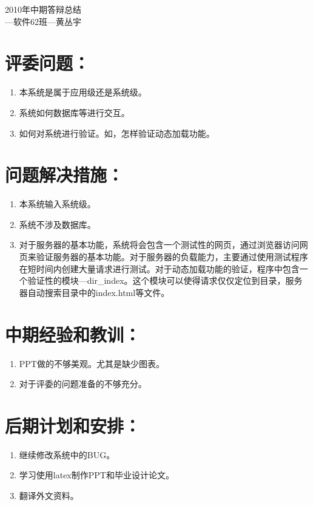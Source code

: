 \documentclass[12pt, a4paper]{article}
\begin{document}
\begin{center}
{\Huge 2010年中期答辩总结}\\
{\Large ---软件62班---黄丛宇}
\end{center}

\section{评委问题：}
\begin{enumerate}[1)]
	\item 本系统是属于应用级还是系统级。
	\item 系统如何数据库等进行交互。
	\item 如何对系统进行验证。如，怎样验证动态加载功能。
\end{enumerate}

\section{问题解决措施：}
\begin{enumerate}[1)]
	\item 本系统输入系统级。
	\item 系统不涉及数据库。
	\item 对于服务器的基本功能，系统将会包含一个测试性的网页，通过浏览器访问网页来验证服务器的基本功能。对于服务器的负载能力，主要通过使用测试程序在短时间内创建大量请求进行测试。对于动态加载功能的验证，程序中包含一个验证性的模块---dir\_index。这个模块可以使得请求仅仅定位到目录，服务器自动搜索目录中的index.html等文件。
\end{enumerate}

\section{中期经验和教训：}
\begin{enumerate}[1)]
	\item PPT做的不够美观。尤其是缺少图表。
	\item 对于评委的问题准备的不够充分。
	
\end{enumerate}

\section{后期计划和安排：}
\begin{enumerate}[1)]
	\item 继续修改系统中的BUG。
	\item 学习使用latex制作PPT和毕业设计论文。
	\item 翻译外文资料。
\end{enumerate}
\end{document}
